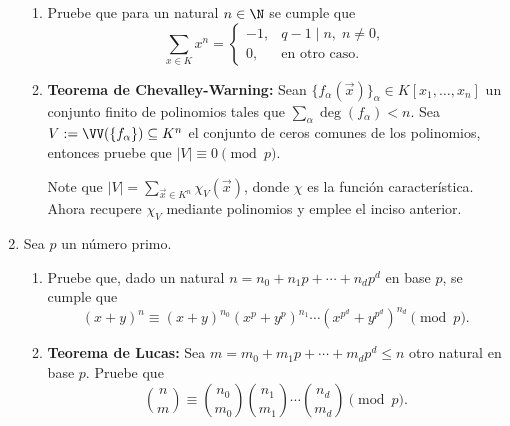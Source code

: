\documentclass[11pt, reqno]{amsart}
\begin{document}
\begin{enumerate}
\begin{enumerate}
			\item Pruebe que para un natural $n \in \N$ se cumple que
				\[
					\sum_{x \in K} x^n =
					\begin{cases}
						-1, & q-1\mid n, \; n \ne 0, \\
						0, & \text{en otro caso.}
					\end{cases}
				\]

			\item \textbf{Teorema de Chevalley-Warning:}
				\lookright
				Sean $\{ f_\alpha(\vec x) \}_\alpha \in K[x_1, \dots, x_n]$ un conjunto finito de polinomios tales que $\sum_{\alpha} \deg(f_\alpha) < n$.
				Sea $V := \VV(\{ f_\alpha \}) \subseteq K^n$ el conjunto de ceros comunes de los polinomios, entonces pruebe que $|V| \equiv 0 \pmod p$.

				\begin{hint}
					Note que $|V| = \sum_{\vec x \in K^n} \chi_V(\vec x)$, donde $\chi$ es la función característica.
					Ahora recupere $\chi_V$ mediante polinomios y emplee el inciso anterior.
				\end{hint}
		\end{enumerate}
		\nocite{serre:arithmetic}

	\item Sea $p$ un número primo.
		\begin{enumerate}
			\item Pruebe que, dado un natural $n = n_0 + n_1p + \cdots + n_dp^d$ en base $p$, se cumple que
				\[
					(x + y)^n \equiv (x + y)^{n_0}(x^p + y^p)^{n_1} \cdots \left( x^{p^d} + y^{p^d} \right)^{n_d} \pmod p.
				\]

			\item \textbf{Teorema de Lucas:}
				Sea $m = m_0 + m_1p + \cdots + m_dp^d \le n$ otro natural en base $p$.
				Pruebe que
				\[
					\binom{n}{m} \equiv \binom{n_0}{m_0} \binom{n_1}{m_1} \cdots \binom{n_d}{m_d} \pmod p.
				\]
		\end{enumerate}
\end{enumerate}
\end{document}
